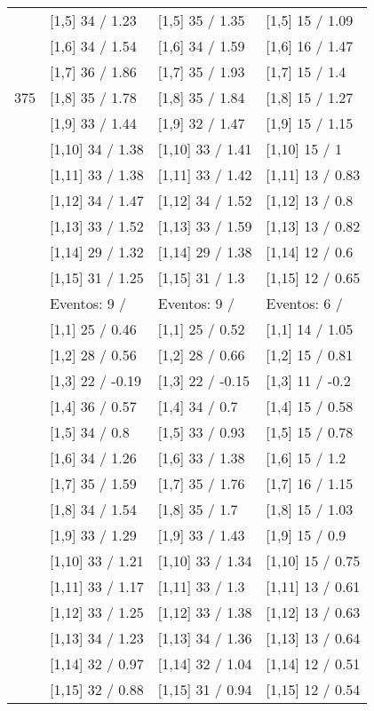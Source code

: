 \begin{table}
\begin{tabular}[t]{llll}
 & {}[1,5] 34  / 1.23 & {}[1,5] 35  / 1.35 & {}[1,5] 15  / 1.09\\
 & {}[1,6] 34  / 1.54 & {}[1,6] 34  / 1.59 & {}[1,6] 16  / 1.47\\
 & {}[1,7] 36  / 1.86 & {}[1,7] 35  / 1.93 & {}[1,7] 15  / 1.4\\
375 & {}[1,8] 35  / 1.78 & {}[1,8] 35  / 1.84 & {}[1,8] 15  / 1.27\\
\addlinespace
 & {}[1,9] 33  / 1.44 & {}[1,9] 32  / 1.47 & {}[1,9] 15  / 1.15\\
 & {}[1,10] 34  / 1.38 & {}[1,10] 33  / 1.41 & {}[1,10] 15  / 1\\
 & {}[1,11] 33  / 1.38 & {}[1,11] 33  / 1.42 & {}[1,11] 13  / 0.83\\
 & {}[1,12] 34  / 1.47 & {}[1,12] 34  / 1.52 & {}[1,12] 13  / 0.8\\
 & {}[1,13] 33  / 1.52 & {}[1,13] 33  / 1.59 & {}[1,13] 13  / 0.82\\
\addlinespace
 & {}[1,14] 29  / 1.32 & {}[1,14] 29  / 1.38 & {}[1,14] 12  / 0.6\\
 & {}[1,15] 31  / 1.25 & {}[1,15] 31  / 1.3 & {}[1,15] 12  / 0.65\\
 & Eventos:  9 / & Eventos:  9 / & Eventos:  6 /\\
 & {}[1,1] 25  / 0.46 & {}[1,1] 25  / 0.52 & {}[1,1] 14  / 1.05\\
 & {}[1,2] 28  / 0.56 & {}[1,2] 28  / 0.66 & {}[1,2] 15  / 0.81\\
\addlinespace
 & {}[1,3] 22  / -0.19 & {}[1,3] 22  / -0.15 & {}[1,3] 11  / -0.2\\
 & {}[1,4] 36  / 0.57 & {}[1,4] 34  / 0.7 & {}[1,4] 15  / 0.58\\
 & {}[1,5] 34  / 0.8 & {}[1,5] 33  / 0.93 & {}[1,5] 15  / 0.78\\
 & {}[1,6] 34  / 1.26 & {}[1,6] 33  / 1.38 & {}[1,6] 15  / 1.2\\
 & {}[1,7] 35  / 1.59 & {}[1,7] 35  / 1.76 & {}[1,7] 16  / 1.15\\
\addlinespace
500 & {}[1,8] 34  / 1.54 & {}[1,8] 35  / 1.7 & {}[1,8] 15  / 1.03\\
 & {}[1,9] 33  / 1.29 & {}[1,9] 33  / 1.43 & {}[1,9] 15  / 0.9\\
 & {}[1,10] 33  / 1.21 & {}[1,10] 33  / 1.34 & {}[1,10] 15  / 0.75\\
 & {}[1,11] 33  / 1.17 & {}[1,11] 33  / 1.3 & {}[1,11] 13  / 0.61\\
 & {}[1,12] 33  / 1.25 & {}[1,12] 33  / 1.38 & {}[1,12] 13  / 0.63\\
\addlinespace
 & {}[1,13] 34  / 1.23 & {}[1,13] 34  / 1.36 & {}[1,13] 13  / 0.64\\
 & {}[1,14] 32  / 0.97 & {}[1,14] 32  / 1.04 & {}[1,14] 12  / 0.51\\
 & {}[1,15] 32  / 0.88 & {}[1,15] 31  / 0.94 & {}[1,15] 12  / 0.54\\
\bottomrule
\end{tabular}
\end{table}

